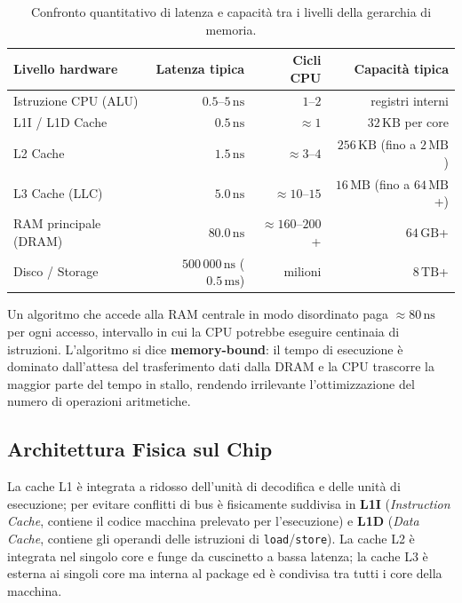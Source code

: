 \begin{table}[htbp]
\centering
\small
\begin{tabular}{l r r r}
\toprule
\textbf{Livello hardware} & \textbf{Latenza tipica} & \textbf{Cicli CPU} & \textbf{Capacit\`a tipica} \\
\midrule
Istruzione CPU (ALU) & $0.5$--$5\,\text{ns}$ & $1$--$2$ & registri interni \\
L1I / L1D Cache & $0.5\,\text{ns}$ & $\approx 1$ & $32\,\text{KB}$ per core \\
L2 Cache & $1.5\,\text{ns}$ & $\approx 3$--$4$ & $256\,\text{KB}$ (fino a $2\,\text{MB}$) \\
L3 Cache (LLC) & $5.0\,\text{ns}$ & $\approx 10$--$15$ & $16\,\text{MB}$ (fino a $64\,\text{MB}$+) \\
RAM principale (DRAM) & $80.0\,\text{ns}$ & $\approx 160$--$200$+ & $64\,\text{GB}$+ \\
Disco / Storage & $500\,000\,\text{ns}$ ($0.5\,\text{ms}$) & milioni & $8\,\text{TB}$+ \\
\bottomrule
\end{tabular}
\caption{Confronto quantitativo di latenza e capacit\`a tra i livelli della gerarchia di memoria.}
\label{tab:gerarchia-memoria}
\end{table}

\begin{definition}
Un algoritmo che accede alla RAM centrale in modo disordinato paga $\approx 80\,\text{ns}$ per ogni accesso, intervallo in cui la CPU potrebbe eseguire centinaia di istruzioni. L'algoritmo si dice \textbf{memory-bound}: il tempo di esecuzione \`e dominato dall'attesa del trasferimento dati dalla DRAM e la CPU trascorre la maggior parte del tempo in stallo, rendendo irrilevante l'ottimizzazione del numero di operazioni aritmetiche.
\end{definition}

\subsection{Architettura Fisica sul Chip}

La cache L1 \`e integrata a ridosso dell'unit\`a di decodifica e delle unit\`a di esecuzione; per evitare conflitti di bus \`e fisicamente suddivisa in \textbf{L1I} (\textit{Instruction Cache}, contiene il codice macchina prelevato per l'esecuzione) e \textbf{L1D} (\textit{Data Cache}, contiene gli operandi delle istruzioni di \texttt{load}/\texttt{store}). La cache L2 \`e integrata nel singolo core e funge da cuscinetto a bassa latenza; la cache L3 \`e esterna ai singoli core ma interna al package ed \`e condivisa tra tutti i core della macchina.

